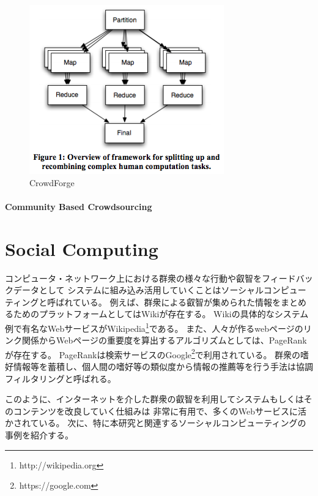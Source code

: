 \begin{figure}[htbp]
  \begin{center}
  \includegraphics[width=.6\linewidth,bb=0 0 318 276]{images/crowdforge.png}
  \end{center}
  \caption{CrowdForge}
  \label{fig:crowdforge}
\end{figure}

\paragraph{Community Based
Crowdsourcing}\label{community-based-crowdsourcing}

\mbox{}

\cite{community-based-crowdsourcing}

\section{Social Computing}\label{social-computing}

コンピュータ・ネットワーク上における群衆の様々な行動や叡智をフィードバックデータとして
システムに組み込み活用していくことはソーシャルコンピューティングと呼ばれている。
例えば、群衆による叡智が集められた情報をまとめるためのプラットフォームとしてはWiki\cite{wiki-way}が存在する。
Wikiの具体的なシステム例で有名なWebサービスがWikipedia\footnote{http://wikipedia.org}である。
また、人々が作るwebページのリンク関係からWebページの重要度を算出するアルゴリズムとしては、PageRank\cite{pagerank}が存在する。
PageRankは検索サービスのGoogle\footnote{https://google.com}で利用されている。
群衆の嗜好情報等を蓄積し、個人間の嗜好等の類似度から情報の推薦等を行う手法は協調フィルタリングと呼ばれる\cite{collaborative-filtering}。

このように、インターネットを介した群衆の叡智を利用してシステムもしくはそのコンテンツを改良していく仕組みは
非常に有用で、多くのWebサービスに活かされている。
次に、特に本研究と関連するソーシャルコンピューティングの事例を紹介する。

